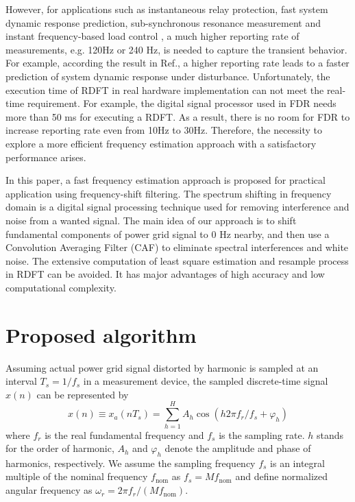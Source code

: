 \documentclass[journal,twoside]{IEEEtran}
\begin{document}
 However, for  applications such as instantaneous relay protection\cite{PRC-024-1}, fast system dynamic response prediction\cite{6863288,CIGRE,68632881}, sub-synchronous resonance measurement \cite{7098450} and instant frequency-based load control \cite{7976165}, a much higher reporting rate of  measurements, e.g. 120Hz or 240 Hz, is needed to capture the transient behavior. For example, according the result in Ref.\cite{CIGRE,68632881}, a higher reporting rate leads to a faster prediction of system dynamic response under disturbance.  Unfortunately, the execution time of RDFT in real hardware implementation can not meet the real-time requirement.
 For example, the digital signal processor used in FDR needs more than 50 ms for executing a RDFT. As a result, there is no room for FDR to increase reporting rate even from 10Hz to 30Hz. Therefore,  the necessity to explore a more efficient frequency estimation approach with  a satisfactory performance arises.

 In this paper, a fast frequency estimation approach is proposed for practical application using frequency-shift filtering. The spectrum shifting in frequency domain  is a  digital signal processing technique used for removing interference and noise from a wanted signal\cite{fresh}. 
 The main idea of our approach is to shift fundamental components of power grid signal to 0 Hz nearby, and then use a Convolution Averaging Filter (CAF) to eliminate spectral interferences and white noise. The extensive computation of least square estimation and resample process in RDFT can be avoided. It has major advantages of high accuracy and low computational complexity.
\section{Proposed  algorithm}
Assuming  actual power grid signal distorted by harmonic is sampled at  an interval $T_s=1/f_s$ in a measurement device,  the sampled discrete-time signal $x(n)$ can be represented by
\begin{equation}
x(n)\equiv x_a(nT_s)=\sum_{h=1}^{H}A_h\cos (h2\pi f_r/f_s+\varphi_h)\label{eqn_3}
\end{equation}
where $f_r$ is the real fundamental frequency and $f_s$ is the sampling rate. $h$ stands for the order of harmonic, $A_h$ and $\varphi_h$ denote the amplitude and phase of  harmonics, respectively.
We assume the sampling frequency $f_s$ is an integral multiple of the nominal frequency $f_\mathrm{nom}$ as $f_s=Mf_\mathrm{nom}$ and define normalized angular frequency as  $\omega_r=2\pi f_r/(Mf_\mathrm{nom})$. 
\end{document}
